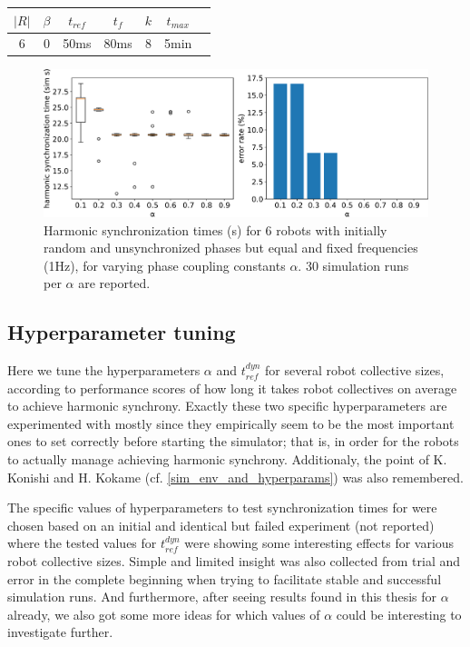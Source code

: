 	\begin{center}
	\begin{tabular}{ |c|c|c|c|c|c|c| } 
	\hline
	$|R|$ & $\beta$ & $t_{ref}$ & $t_f$ & $k$ & $t_{max}$ \\
	\hline
	6 & 0 & 50ms & 80ms & 8 & 5min \\
	\hline
	\end{tabular}
	\label{tab:baseline_reproducing_phase_sync_for_alpha}
	\end{center}
	
	\begin{figure}[ht!]
		\centering
		\includegraphics[width=\linewidth]{Assets/DocSegments/Chapters/ExperimentsAndResults/Figures/PerfScores/baseline_reproducing_phase_sync_for_alpha.pdf}
		\caption{Harmonic synchronization times (s) for 6 robots with initially random and unsynchronized phases but equal and fixed frequencies (1Hz), for varying phase coupling constants $\alpha$. 30 simulation runs per $\alpha$ are reported.}
		\label{fig:baseline_reproducing_phase_sync_for_alpha}
	\end{figure}
	
	
	\subsection{Hyperparameter tuning}
	
	Here we tune the hyperparameters $\alpha$ and $t_{ref}^{dyn}$ for several robot collective sizes, according to performance scores of how long it takes robot collectives on average to achieve harmonic synchrony. Exactly these two specific hyperparameters are experimented with mostly since they empirically seem to be the most important ones to set correctly before starting the simulator; that is, in order for the robots to actually manage achieving harmonic synchrony. Additionaly, the point of K. Konishi and H. Kokame (cf. \ref{sim_env_and_hyperparams}) was also remembered.
	
	The specific values of hyperparameters to test synchronization times for were chosen based on an initial and identical but failed experiment (not reported) where the tested values for $t_{ref}^{dyn}$ were showing some interesting effects for various robot collective sizes. Simple and limited insight was also collected from trial and error in the complete beginning when trying to facilitate stable and successful simulation runs. And furthermore, after seeing results found in this thesis for $\alpha$ already, we also got some more ideas for which values of $\alpha$ could be interesting to investigate further.
	
